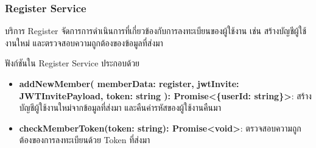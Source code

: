 \subsubsection{Register Service}

\ifenglish
\else
บริการ Register จัดการการดำเนินการที่เกี่ยวข้องกับการลงทะเบียนของผู้ใช้งาน เช่น สร้างบัญชีผู้ใช้งานใหม่ และตรวจสอบความถูกต้องของข้อมูลที่ส่งมา

ฟังก์ชันใน Register Service ประกอบด้วย
\begin{itemize}
    \item \textbf{addNewMember(
        memberData: register,
        jwtInvite: JWTInvitePayload,
        token: string
        ): Promise<\{userId: string\}>}: สร้างบัญชีผู้ใช้งานใหม่จากข้อมูลที่ส่งมา และคืนค่ารหัสของผู้ใช้งานคืนมา
    \item \textbf{checkMemberToken(token: string): Promise<void>}: ตรวจสอบความถูกต้องของการลงทะเบียนด้วย Token ที่ส่งมา
\end{itemize}
\fi